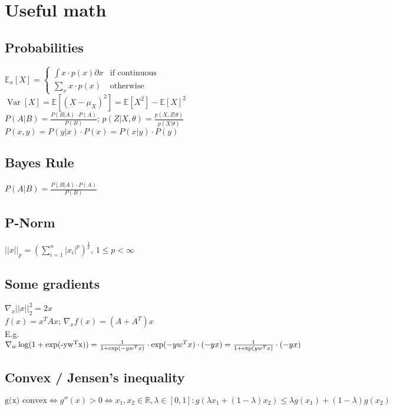 \section*{Useful math}

\subsection*{Probabilities}
$\mathbb{E}_x[X] = \begin{cases}
   \int x \cdot p(x) \partial x  & \text{if continuous}\\
   \sum_x x \cdot p(x) & \text{otherwise}
  \end{cases}$\\
$\operatorname{Var}[X] = \mathbb{E}[(X-\mu_X)^2] = \mathbb{E}[X^2] - \mathbb{E}[X]^2$\\
$P(A|B) = \frac{P(B|A) \cdot P(A)}{P(B)}$; $p(Z|X,\theta) = \frac{p(X,Z|\theta)}{p(X|\theta)}$\\
$P(x,y) = P(y|x) \cdot  P(x) = P(x|y) \cdot P(y)$

\subsection*{Bayes Rule}
$P(A|B) = \frac{P(B|A) \cdot P(A)}{P(B)}$

\subsection*{P-Norm}
$||x||_p = (\sum_{i=1}^n|x_i|^p)^{\frac{1}{p}}$, $1 \leq p < \infty$

\subsection*{Some gradients}
$\nabla_x ||x||_2^2 = 2 x$\\
$f(x) = x^T A x$; $\nabla_x f(x) = (A + A^T) x$\\
E.g. $\nabla_w \operatorname{log}(1+\operatorname{exp(-y w^T x)}) = \\
\frac{1}{1+\operatorname{exp}(-y w^T x)} \cdot \operatorname{exp}(-y w^T x) \cdot (-y x) = \\
\frac{1}{1 + \operatorname{exp}(y w^T x)} \cdot(-yx)$

\subsection*{Convex / Jensen's inequality}
$\text{g(x) convex} \Leftrightarrow g''(x) > 0 \Leftrightarrow x_1,x_2 \in \mathbb{R}, \lambda \in [0,1]: 
g(\lambda x_1 + (1-\lambda) x_2) \leq \lambda g(x_1) + (1-\lambda) g(x_2)$

